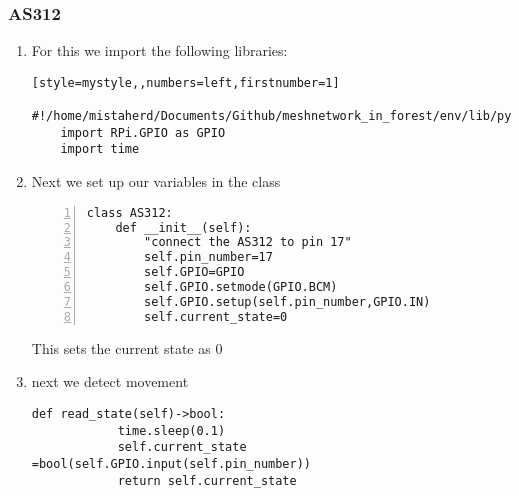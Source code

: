 \subsubsection{AS312}
\begin{enumerate}

\item For this we import the following libraries:

\begin{lstlisting}[style=mystyle,,numbers=left,firstnumber=1]
    #!/home/mistaherd/Documents/Github/meshnetwork_in_forest/env/lib/python3.11
    import RPi.GPIO as GPIO
    import time
\end{lstlisting}

    \item Next we set up our variables  in the class

    \begin{lstlisting}[style=mystyle,numbers=left,firstnumber=1]
    class AS312:
	def __init__(self):
		"connect the AS312 to pin 17"
		self.pin_number=17
		self.GPIO=GPIO
		self.GPIO.setmode(GPIO.BCM)
		self.GPIO.setup(self.pin_number,GPIO.IN)
		self.current_state=0
    \end{lstlisting}
    This sets the current state as 0
    \item next  we detect  movement
    \begin{lstlisting}[style=mystyle]
        def read_state(self)->bool:
            time.sleep(0.1)
            self.current_state =bool(self.GPIO.input(self.pin_number))
            return self.current_state
    \end{lstlisting}

\end{enumerate}

